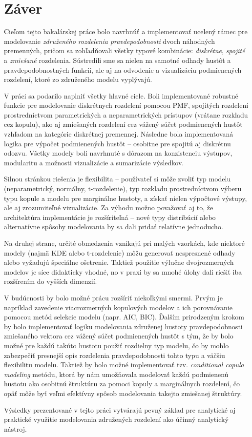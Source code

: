 \chapter{Záver}

Cieľom tejto bakalárskej práce bolo navrhnúť a implementovať ucelený rámec pre modelovanie \textit{združeného rozdelenia pravdepodobnosti} dvoch náhodných premenných, pričom sa zohľadňovali všetky typové kombinácie: \textit{diskrétne}, \textit{spojité} a \textit{zmiešané} rozdelenia. Sústredili sme sa nielen na samotné odhady hustôt a pravdepodobnostných funkcií, ale aj na odvodenie a vizualizáciu podmienených rozdelení, ktoré zo združeného modelu vyplývajú.

V práci sa podarilo naplniť všetky hlavné ciele. Boli implementované robustné funkcie pre modelovanie diskrétnych rozdelení pomocou PMF, spojitých rozdelení prostredníctvom parametrických a neparametrických prístupov (vrátane rozkladu cez kopulu), ako aj zmiešaných rozdelení cez vážený súčet podmienených hustôt vzhľadom na kategórie diskrétnej premennej. Následne bola implementovaná logika pre výpočet podmienených hustôt – osobitne pre spojitú aj diskrétnu odozvu. Všetky modely boli navrhnuté s dôrazom na konzistenciu výstupov, modularitu a možnosti vizualizácie a sumarizácie výsledkov.

Silnou stránkou riešenia je flexibilita – používateľ si môže zvoliť typ modelu (neparametrický, normálny, t-rozdelenie), typ rozkladu prostredníctvom výberu typu kopule a modelu pre marginálne hustoty, a získať nielen výpočtové výstupy, ale aj zrozumiteľné vizualizácie. Za výhodu možno považovať aj to, že architektúra implementácie je rozšíriteľná – nové typy distribúcií alebo alternatívne spôsoby modelovania by sa dali pridať relatívne jednoducho.

Na druhej strane, určité obmedzenia vznikajú pri malých vzorkách, kde niektoré modely (najmä KDE alebo t-rozdelenie) môžu generovať nespresnené odhady alebo vyžadujú špeciálne ošetrenie. Taktiež použitie výlučne dvojrozmerných modelov je síce didakticky vhodné, no v praxi by sa mnohé úlohy dali riešiť iba rozšírením do vyšších dimenzií.

V budúcnosti by bolo možné prácu rozšíriť niekoľkými smermi. Prvým je napríklad zavedenie viacrozmerných kopulových modelov a ich porovnávanie pomocou metód selekcie modelu (napr. AIC, BIC). Ďalším prirodzeným krokom by bolo implementovať logiku modelovania združenej hustoty pravdepodobnosti zmiešaného vektora cez vážený súčet podmienených hustôt s tým, že by bolo možné pre každú takúto hustotu použiť rozdielny typ modelu, čo by mohlo zabezpečiť presnejší opis rozdelenia pravdepodobnosti tohto typu a väčšiu flexibilitu modelu. Taktiež by bolo možné implementovať tzv. \textit{conditional copula modeling} metódu, ktorá by nám umožňovala modelovať každú podmienenú hustotu ako osobitnú štruktúru za pomoci kopuly a marginálnych rozdelení, čo opäť môže byť veľmi efektívny spôsob modelovania takejto zmiešanej štruktúry.

Výsledky prezentované v tejto práci vytvárajú pevný základ pre analytické aj praktické využitie modelovania združených rozdelení ako účinný analytický nástroj.